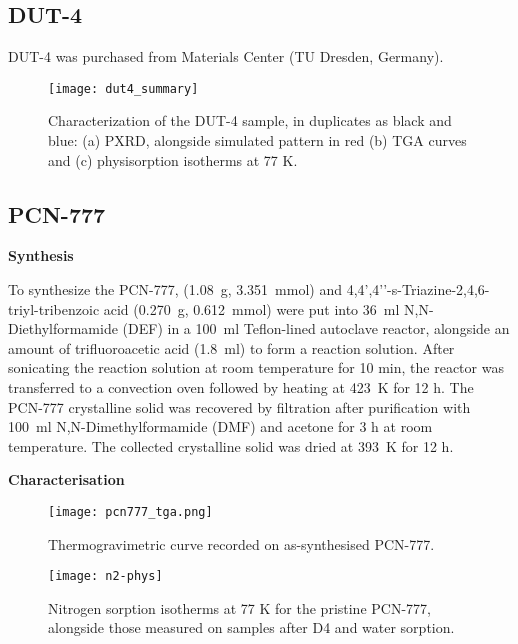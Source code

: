 \subsection{DUT-4}

DUT-4 was purchased from Materials Center (TU Dresden, Germany).

\begin{figure}[H]
    \centering
    \texttt{[image: dut4\_summary]}
    \caption{%
        Characterization of the DUT-4 sample, in duplicates as black
        and blue: (a) PXRD, alongside simulated pattern in red (b) TGA curves
        and (c)  physisorption isotherms at 77 K.
    }\label{fig:dut4-summary}
\end{figure}

\subsection{PCN-777}

\textbf{Synthesis}

To synthesize the PCN-777,  (\SI{1.08}{\gram},
\SI{3.351}{\milli\mol}) and 4,4’,4’’-s-Triazine-2,4,6-triyl-tribenzoic acid
(\SI{0.270}{\gram}, \SI{0.612}{\milli\mol}) were put into \SI{36}{\milli\litre}
N,N-Diethylformamide (DEF) in a \SI{100}{\milli\litre} Teflon-lined autoclave
reactor, alongside an amount of trifluoroacetic acid (\SI{1.8}{\milli\litre}) to
form a reaction solution. After sonicating the reaction solution at room
temperature for 10 min, the reactor was transferred to a convection oven
followed by heating at \SI{423}{\kelvin} for 12 h. The PCN-777 crystalline solid
was recovered by filtration after purification with \SI{100}{\milli\litre}
N,N-Dimethylformamide (DMF) and acetone for 3 h at room temperature. The
collected crystalline solid was dried at \SI{393}{\kelvin} for 12 h.

\textbf{Characterisation}

\begin{figure}[H]
    \centering
    \texttt{[image: pcn777\_tga.png]}
    \caption{%
        Thermogravimetric curve recorded on as-synthesised PCN-777.
    }\label{fig:tga}
\end{figure}

\begin{figure}[H]
    \centering
    \texttt{[image: n2-phys]}
    \caption{%
        Nitrogen sorption isotherms at 77 K for the pristine
        PCN-777, alongside those measured on samples after D4 and water
        sorption.
    }\label{fig:n2-phys}
\end{figure}


